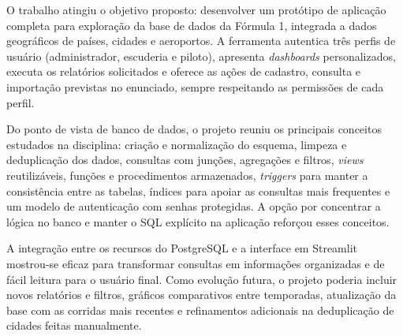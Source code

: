 \documentclass[12pt,a4paper]{article}
\begin{document}
O trabalho atingiu o objetivo proposto: desenvolver um protótipo de aplicação completa para exploração da base de dados da Fórmula 1, integrada a dados geográficos de países, cidades e aeroportos. A ferramenta autentica três perfis de usuário (administrador, escuderia e piloto), apresenta \textit{dashboards} personalizados, executa os relatórios solicitados e oferece as ações de cadastro, consulta e importação previstas no enunciado, sempre respeitando as permissões de cada perfil.

Do ponto de vista de banco de dados, o projeto reuniu os principais conceitos estudados na disciplina: criação e normalização do esquema, limpeza e deduplicação dos dados, consultas com junções, agregações e filtros, \textit{views} reutilizáveis, funções e procedimentos armazenados, \textit{triggers} para manter a consistência entre as tabelas, índices para apoiar as consultas mais frequentes e um modelo de autenticação com senhas protegidas. A opção por concentrar a lógica no banco e manter o SQL explícito na aplicação reforçou esses conceitos.

A integração entre os recursos do PostgreSQL e a interface em Streamlit mostrou-se eficaz para transformar consultas em informações organizadas e de fácil leitura para o usuário final. Como evolução futura, o projeto poderia incluir novos relatórios e filtros, gráficos comparativos entre temporadas, atualização da base com as corridas mais recentes e refinamentos adicionais na deduplicação de cidades feitas manualmente.
\end{document}
